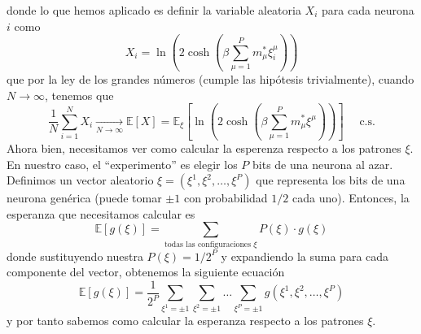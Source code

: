 donde lo que hemos aplicado es definir la variable aleatoria $X_i$ para cada neurona $i$ como
\begin{equation*}
    X_i = \ln \left( 2 \cosh \left( \beta \sum_{\mu=1}^P m_{\mu}^* \xi_i^\mu \right) \right)
\end{equation*}
que por la ley de los grandes números (cumple las hipótesis trivialmente), cuando $N \to \infty$, tenemos que
\begin{equation*}
    \frac{1}{N} \sum_{i=1}^N X_i \underset{N \to \infty}{\to} \mathbb{E}[X] = \mathbb{E}_{\xi} \left[ \ln \left( 2 \cosh \left( \beta \sum_{\mu=1}^P m_{\mu}^* \xi^{\mu} \right) \right) \right] \quad \text{ c.s.}
\end{equation*}
Ahora bien, necesitamos ver como calcular la esperenza respecto a los patrones $\xi$. En nuestro caso, el ``experimento'' es elegir los $P$ bits de una neurona al azar. Definimos un vector aleatorio \mbox{$\xi = (\xi^1, \xi^2, \dots, \xi^P)$} que representa los bits de una neurona genérica (puede tomar $\pm 1$ con probabilidad $1/2$ cada uno). Entonces, la esperanza que necesitamos calcular es
\begin{equation*}
    \mathbb{E}[g(\xi)] = \sum_{\text{todas las configuraciones } \xi} P(\xi) \cdot g(\xi) 
\end{equation*}
donde sustituyendo nuestra $P(\xi) = 1/2^P$ y expandiendo la suma para cada componente del vector, obtenemos la siguiente ecuación
\begin{equation*}
    \mathbb{E} [g(\xi)] = \frac{1}{2^P} \sum_{\xi^1=\pm 1} \sum_{\xi^2=\pm 1} \dots \sum_{\xi^P=\pm 1} g(\xi^1, \xi^2, \dots, \xi^P)
\end{equation*}
y por tanto sabemos como calcular la esperanza respecto a los patrones $\xi$. \\

